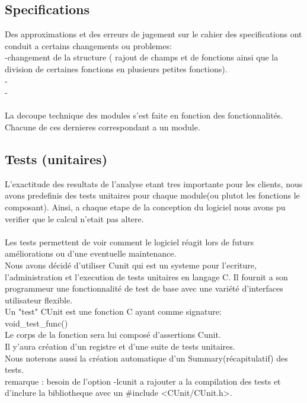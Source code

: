 \documentclass[a4]{article}
\begin{document}
	
		
		\subsection{Specifications}
		Des approximations et des erreurs de jugement sur le cahier des specifications ont conduit a certains changements ou problemes:\\
		-changement de la structure ( rajout de champs et de fonctions ainsi que la division de certaines fonctions en plusieurs
		 petites fonctions).\\
		-\\
		-\\ \\
		
		
		
		

		La decoupe technique des modules s'est faite en fonction des fonctionnalités.
		 Chacune de ces dernieres correspondant a un module.
		
		\subsection{Tests (unitaires)}
		L’exactitude des resultats de l'analyse etant tres importante pour les clients, nous avons predefinis des tests
unitaires pour chaque module(ou plutot les fonctions le composant). Ainsi, a chaque etape de la conception du logiciel
nous avons pu verifier que le calcul n’etait pas altere. \\ \\
Les tests permettent de voir comment le logiciel réagit lors de futurs améliorations ou d'une eventuelle maintenance. \\ 
 
Nous avons décidé d'utiliser Cunit qui est un systeme pour l'ecriture, l'administration et l'execution de tests unitaires
en langage C. Il fournit a son programmeur une fonctionnalité de test de base avec une variété d'interfaces utilisateur flexible.\\
Un "test"  CUnit est une fonction C ayant comme signature:\\
void\_test\_func()\\
Le corps de la fonction sera lui composé d'assertions Cunit.\\
Il y'aura création d'un registre et d'une suite de tests unitaires.\\
Nous noterons aussi la création automatique d'un Summary(récapitulatif) des tests.\\
remarque : besoin de l'option -lcunit a rajouter a la compilation des tests et d'inclure la bibliotheque avec un
\#include <CUnit/CUnit.h>.\\ \\ \\ 
\end{document}
